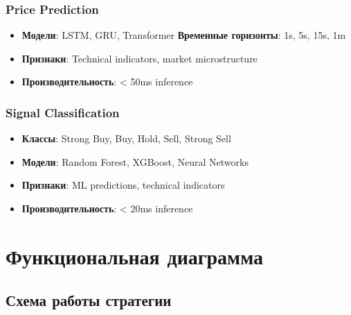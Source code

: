 \documentclass[12pt,a4paper]{article}
\begin{document}
\subsubsection{Price Prediction}
\begin{itemize}
    \item \textbf{Модели}: LSTM, GRU, Transformer
    \textbf{Временные горизонты}: 1s, 5s, 15s, 1m
    \item \textbf{Признаки}: Technical indicators, market microstructure
    \item \textbf{Производительность}: < 50ms inference
\end{itemize}

\subsubsection{Signal Classification}
\begin{itemize}
    \item \textbf{Классы}: Strong Buy, Buy, Hold, Sell, Strong Sell
    \item \textbf{Модели}: Random Forest, XGBoost, Neural Networks
    \item \textbf{Признаки}: ML predictions, technical indicators
    \item \textbf{Производительность}: < 20ms inference
\end{itemize}

\section{Функциональная диаграмма}

\subsection{Схема работы стратегии}
\end{document}
